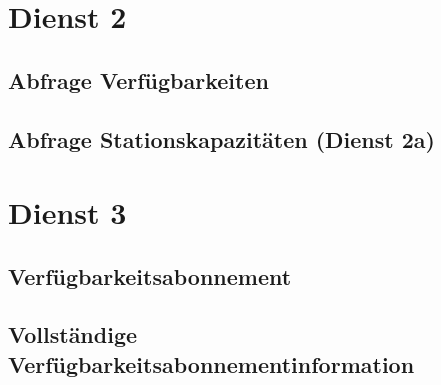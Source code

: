 \section{Dienst 2}
\label{subsec:Nachrichten:Dienst2}

\subsection*{Abfrage Verfügbarkeiten}
\label{subsec:Nachrichten:Dienst2:Availability}





\subsection*{Abfrage Stationskapazitäten (Dienst 2a)}
\label{subsec:Nachrichten:Dienst2:PlaceAvailability}





\section{Dienst 3}
\label{subsec:Nachrichten:Dienst3}

\subsection*{Verfügbarkeitsabonnement}
\label{subsec:Nachrichten:Dienst3:AvailabilitySubscription}







\subsection*{Vollständige Verfügbarkeitsabonnementinformation}
\label{subsec:Nachrichten:Dienst3:CompleteAvailability}






